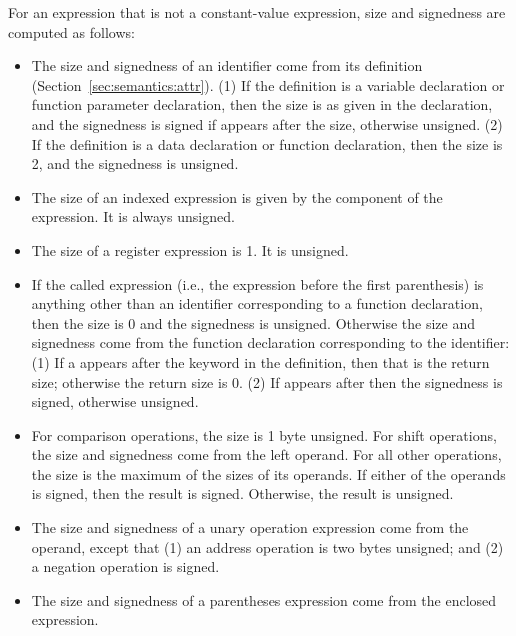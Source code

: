 \documentclass[10pt]{article}
\begin{document}
For an expression that is not a constant-value expression, size and
signedness are computed as follows:
%
\begin{itemize}
%
\item {} The size and signedness of an identifier
  come from its definition (Section~\ref{sec:semantics:attr}).  (1) If
  the definition is a variable declaration or function parameter
  declaration, then the size is as given in the declaration, and the
  signedness is signed if  appears after the size, otherwise
  unsigned.  (2) If the definition is a data declaration or function
  declaration, then the size is 2, and the signedness is unsigned.
%
\item {} The size of an indexed expression
  is given by the  component of the expression.  It is
  always unsigned.  
%
\item {} The size of a register expression
  is 1.  It is unsigned.
%
\item {} If the called expression (i.e., the
  expression before the first parenthesis) is anything other than an
  identifier corresponding to a function declaration, then the size is
  0 and the signedness is unsigned.  Otherwise the size and signedness
  come from the function declaration corresponding to the identifier:
  (1) If a  appears after the keyword  in the
  definition, then that is the return size; otherwise the return size
  is 0.  (2) If  appears after  then the
  signedness is signed, otherwise unsigned.
%
\item {}  For comparison
  operations, the size is 1 byte unsigned.  For shift operations, the
  size and signedness come from the left operand.  For all other
  operations, the size is the maximum of the sizes of its operands.
  If either of the operands is signed, then the result is signed.
  Otherwise, the result is unsigned.
%
\item {} The size and signedness of
  a unary operation expression come from the operand, except that (1)
  an address operation  is two bytes unsigned; and (2) a
  negation operation is signed.
%
\item {} The size and signedness of a
  parentheses expression come from the enclosed expression.
%
\end{itemize}
\end{document}
